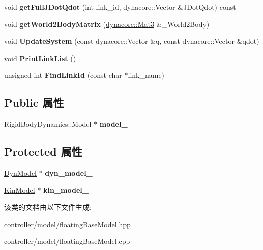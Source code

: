 \begin{DoxyCompactItemize}
void {\bfseries get\+Full\+J\+Dot\+Qdot} (int link\+\_\+id, dynacore\+::\+Vector \&J\+Dot\+Qdot) const
\item 
\mbox{\label{classquadruped_1_1FloatingBaseModel_a69cddd67f824106ba6701543cac5aa59}} 
void {\bfseries get\+World2\+Body\+Matrix} (\hyperlink{cppTypes_8h_adb7d462b35d31f0b2583b3e230a2a2c3}{dynacore\+::\+Mat3} \&\+\_\+\+World2\+Body)
\item 
\mbox{\label{classquadruped_1_1FloatingBaseModel_aeb288572af74c8f33301278db6457df6}} 
void {\bfseries Update\+System} (const dynacore\+::\+Vector \&q, const dynacore\+::\+Vector \&qdot)
\item 
\mbox{\label{classquadruped_1_1FloatingBaseModel_a64aa3de0bde270639f9d8ae15e14a6da}} 
void {\bfseries Print\+Link\+List} ()
\item 
\mbox{\label{classquadruped_1_1FloatingBaseModel_a528aa7164d4ddae2023d42ee800d0daa}} 
unsigned int {\bfseries Find\+Link\+Id} (const char $\ast$link\+\_\+name)
\end{DoxyCompactItemize}
\subsection*{Public 属性}
\begin{DoxyCompactItemize}
\item 
\mbox{\label{classquadruped_1_1FloatingBaseModel_ac660e406ae345554214e1fb8a4ae306c}} 
Rigid\+Body\+Dynamics\+::\+Model $\ast$ {\bfseries model\+\_\+}
\end{DoxyCompactItemize}
\subsection*{Protected 属性}
\begin{DoxyCompactItemize}
\item 
\mbox{\label{classquadruped_1_1FloatingBaseModel_ad202e2949cc99f2db21a96e23018fdc3}} 
\hyperlink{classquadruped_1_1DynModel}{Dyn\+Model} $\ast$ {\bfseries dyn\+\_\+model\+\_\+}
\item 
\mbox{\label{classquadruped_1_1FloatingBaseModel_a1baa9dc5905af1e90b0c86bc9b88bc76}} 
\hyperlink{classquadruped_1_1KinModel}{Kin\+Model} $\ast$ {\bfseries kin\+\_\+model\+\_\+}
\end{DoxyCompactItemize}


该类的文档由以下文件生成\+:\begin{DoxyCompactItemize}
\item 
controller/model/floating\+Base\+Model.\+hpp\item 
controller/model/floating\+Base\+Model.\+cpp\end{DoxyCompactItemize}
